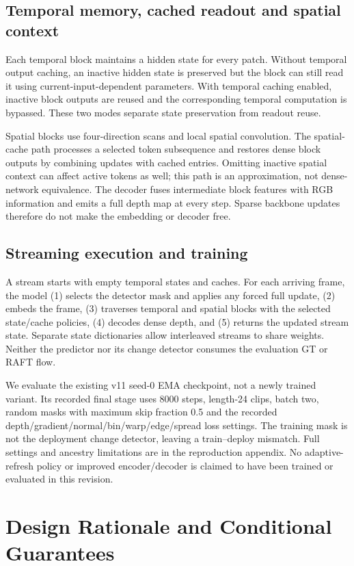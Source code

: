 \documentclass[mathematics,article,submit,moreauthors]{Definitions/mdpi}
\begin{document}
\subsection{Temporal memory, cached readout and spatial context}
Each temporal block maintains a hidden state for every patch. Without temporal
output caching, an inactive hidden state is preserved but the block can still
read it using current-input-dependent parameters. With temporal caching enabled,
inactive block outputs are reused and the corresponding temporal computation
is bypassed. These two modes separate state preservation from readout reuse.

Spatial blocks use four-direction scans and local spatial convolution. The
spatial-cache path processes a selected token subsequence and restores dense
block outputs by combining updates with cached entries. Omitting inactive
spatial context can affect active tokens as well; this path is an approximation,
not dense-network equivalence. The decoder fuses intermediate block features
with RGB information and emits a full depth map at every step. Sparse backbone
updates therefore do not make the embedding or decoder free.

\subsection{Streaming execution and training}
A stream starts with empty temporal states and caches. For each arriving frame,
the model (1) selects the detector mask and applies any forced full update,
(2) embeds the frame, (3) traverses temporal and spatial blocks with the selected
state/cache policies, (4) decodes dense depth, and (5) returns the updated stream
state. Separate state dictionaries allow interleaved streams to share weights.
Neither the predictor nor its change detector consumes the evaluation GT or RAFT flow.

We evaluate the existing v11 seed-0 EMA checkpoint, not a newly trained variant.
Its recorded final stage uses 8000 steps, length-24 clips, batch two, random masks
with maximum skip fraction 0.5 and the recorded depth/gradient/normal/bin/warp/edge/spread
loss settings. The training mask is not the deployment change detector, leaving
a train--deploy mismatch. Full settings and ancestry limitations are in the
reproduction appendix. No adaptive-refresh policy or improved encoder/decoder
is claimed to have been trained or evaluated in this revision.

\section{Design Rationale and Conditional Guarantees}
\end{document}
